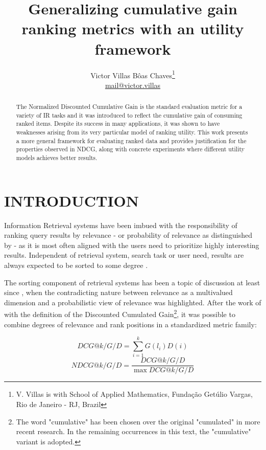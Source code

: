 \documentclass[a4paper, 10pt, conference]{ieeeconf}
\title{\LARGE \bf Generalizing cumulative gain ranking metrics with an utility framework}
\author{Victor Villas Bôas Chaves\thanks{V. Villas is with School of Applied
Mathematics, Fundação Getúlio Vargas, Rio de Janeiro - RJ,
Brazil}\\\small\href{mailto:mail@victor.villas}{mail@victor.villas}}
\begin{document}
\maketitle
\thispagestyle{empty}
\pagestyle{empty}


\begin{abstract}
The Normalized Discounted Cumulative Gain is the standard evaluation metric for
a variety of IR tasks and it was introduced to reflect the cumulative gain of
consuming ranked items. Despite its success in many applications, it was shown
to have weaknesses arising from its very particular model of ranking utility.
This work presents a more general framework for evaluating ranked data and
provides justification for the properties observed in NDCG, along with concrete
experiments where different utility models achieves better results.
\end{abstract}


\section{INTRODUCTION}
Information Retrieval systems have been imbued with the responsibility of
ranking query results by relevance - or probability of relevance as
distinguished by \cite{Stephen1977} - as it is most often aligned with the users
need to prioritize highly interesting results. Independent of retrieval system,
search task or user need, results are always expected to be sorted to some
degree \cite{Cooper1968}.

The sorting component of retrieval systems has been a topic of discussion at
least since \cite{Stephen1978}, when the contradicting nature between relevance
as a multivalued dimension and a probabilistic view of relevance was
highlighted. After the work of \cite{Jarvelin2002} with the definition of the
Discounted Cumulated Gain\footnote{The word "cumulative" has been chosen over
the original "cumulated" in more recent research. In the remaining occurrences
in this text, the "cumulative" variant is adopted.}, it was possible to combine
degrees of relevance and rank positions in a standardized metric family:

\begin{equation}
\label{eq:dcg}
DCG@k/G/D = \sum_{i=1}^k G(l_i)D(i)
\end{equation}
\begin{equation}
\label{eq:ndcg}
NDCG@k/G/D = \frac{DCG@k/G/D}{\max DCG@k/G/D}
\end{equation}
\end{document}
